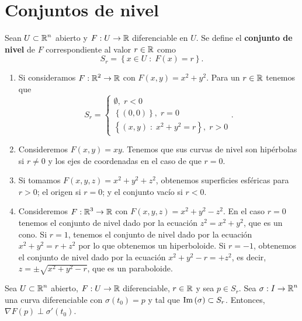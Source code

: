 \section{Conjuntos de nivel}
\begin{definition}
Sean $\displaystyle U \subset \mathbb{R}^{n} $ abierto y $\displaystyle F : U \to \mathbb{R} $ diferenciable en $\displaystyle U $. Se define el \textbf{conjunto de nivel} de $\displaystyle F $ correspondiente al valor $\displaystyle r \in \mathbb{R} $ como 
\[S_{r} = \left\{ x \in U \; : \; F\left(x\right) = r\right\}  .\]
\end{definition}
\begin{eg}
\begin{enumerate}
\item Si consideramos $\displaystyle F : \mathbb{R}^{2} \to \mathbb{R} $ con $\displaystyle F\left(x,y\right) = x^{2}+y^{2} $. Para un $\displaystyle r \in \mathbb{R} $ tenemos que 
	\[S_{r} = 
	\begin{cases}
	\emptyset, \; r < 0 \\ 
	\left\{ \left(0,0\right)\right\} , \; r = 0 \\
	\left\{ \left(x,y\right) \; : \; x^{2} +y^{2} = r\right\} , \; r > 0
	\end{cases}
	.\]
\item Consideremos $\displaystyle F\left(x,y\right) = xy $. Tenemos que sus curvas de nivel son hipérbolas si $\displaystyle r \neq 0 $ y los ejes de coordenadas en el caso de que $\displaystyle r = 0 $. 	
\item Si tomamos $\displaystyle F\left(x,y,z\right) = x^{2}+y^{2}+z^{2} $, obtenemos superficies esféricas para $\displaystyle r > 0 $; el origen si $\displaystyle r = 0 $; y el conjunto vacío si $\displaystyle r < 0 $.
\item Consideremos $\displaystyle F : \mathbb{R}^{3} \to \mathbb{R} $ con $\displaystyle F\left(x,y,z\right)= x^{2}+y^{2} -z^{2} $. En el caso $\displaystyle r = 0 $ tenemos el conjunto de nivel dado por la ecuación $\displaystyle z^{2} = x^{2} +y^{2} $, que es un cono. Si $\displaystyle r = 1 $, tenemos el conjunto de nivel dado por la ecuación $\displaystyle x^{2}+y^{2} = r + z^{2} $ por lo que obtenemos un hiperboloide. Si $\displaystyle r = -1 $, obtenemos el conjunto de nivel dado por la ecuación $\displaystyle x^{2} +y^{2} - r = + z^{2} $, es decir, $\displaystyle z = \pm\sqrt{x^{2}+y^{2}-r} $, que es un paraboloide.
\end{enumerate}
\end{eg}
\begin{prop}
Sea $\displaystyle U \subset \mathbb{R}^{n} $ abierto, $\displaystyle F : U \to \mathbb{R} $ diferenciable, $\displaystyle r \in \mathbb{R} $ y sea $\displaystyle p \in S_{r} $. Sea $\displaystyle \sigma : I \to \mathbb{R}^{n} $ una curva diferenciable con $\displaystyle \sigma\left(t_{0}\right) = p $ y tal que $\displaystyle \operatorname{Im}\left(\sigma \right)\subset S_{r} $. Entonces, $\displaystyle \nabla F\left(p\right) \perp \sigma'\left(t_{0}\right) $.
\end{prop}
